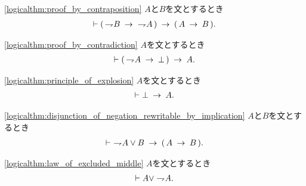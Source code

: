 	\begin{screen}
		\begin{logicalthm}[対偶論法の原理]
		\ref{logicalthm:proof_by_contraposition}
			$A$と$B$を文とするとき
			\begin{align}
				\vdash (\, \rightharpoondown\hspace{-0.25em} B \hspace{0.25em}\rightarrow\hspace{0.25em}\ \rightharpoondown\hspace{-0.25em} A\, )
				\hspace{0.25em}\rightarrow\hspace{0.25em} (\, A \hspace{0.25em}\rightarrow\hspace{0.25em} B\, ).
			\end{align}
		\end{logicalthm}
	\end{screen}
	
	\begin{screen}
		\begin{logicalthm}[背理法の原理]
		\ref{logicalthm:proof_by_contradiction}
			$A$を文とするとき
			\begin{align}
				\vdash (\, \rightharpoondown\hspace{-0.25em} A \hspace{0.25em}\rightarrow\hspace{0.25em} \bot\, ) \hspace{0.25em}\rightarrow\hspace{0.25em} A.
			\end{align}
		\end{logicalthm}
	\end{screen}
	
	\begin{screen}
		\begin{logicalthm}[爆発律]
		\ref{logicalthm:principle_of_explosion}
			$A$を文とするとき
			\begin{align}
				\vdash \bot \hspace{0.25em}\rightarrow\hspace{0.25em} A.
			\end{align}
		\end{logicalthm}
	\end{screen}
	
	\begin{screen}
		\begin{logicalthm}[否定の論理和は含意で書ける]
		\ref{logicalthm:disjunction_of_negation_rewritable_by_implication}
			$A$と$B$を文とするとき
			\begin{align}
				\vdash\ \rightharpoondown\hspace{-0.25em} A \vee B \hspace{0.25em}\rightarrow\hspace{0.25em} (\, A \hspace{0.25em}\rightarrow\hspace{0.25em} B\, ).
			\end{align}
		\end{logicalthm}
	\end{screen}
	
	\begin{screen}
		\begin{logicalthm}[排中律]\ref{logicalthm:law_of_excluded_middle}
			$A$を文とするとき
			\begin{align}
				\vdash A \vee \rightharpoondown\hspace{-0.25em} A.
			\end{align}
		\end{logicalthm}
	\end{screen}
	
